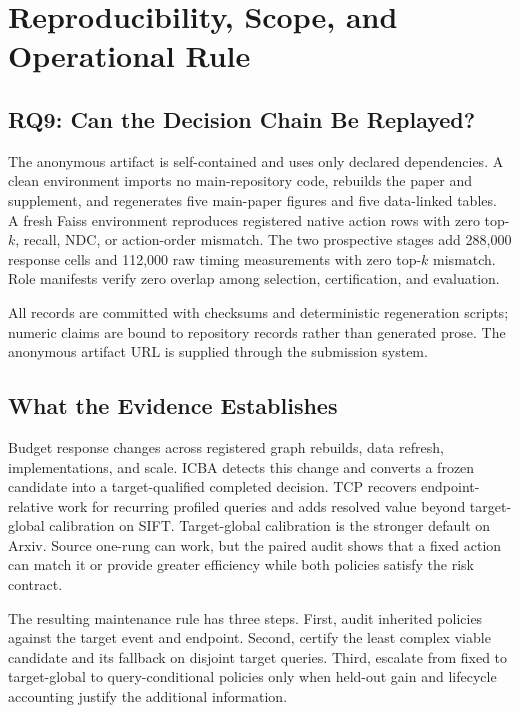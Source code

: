 \section{Reproducibility, Scope, and Operational Rule}
\label{sec:discussion}

\subsection{RQ9: Can the Decision Chain Be Replayed?}
The anonymous artifact is self-contained and uses only declared dependencies. A clean environment imports no main-repository code, rebuilds the paper and supplement, and regenerates five main-paper figures and five data-linked tables. A fresh Faiss environment reproduces registered native action rows with zero top-$k$, recall, NDC, or action-order mismatch. The two prospective stages add 288,000 response cells and 112,000 raw timing measurements with zero top-$k$ mismatch. Role manifests verify zero overlap among selection, certification, and evaluation.

All records are committed with checksums and deterministic regeneration scripts; numeric claims are bound to repository records rather than generated prose. The anonymous artifact URL is supplied through the submission system.

\subsection{What the Evidence Establishes}
Budget response changes across registered graph rebuilds, data refresh, implementations, and scale. ICBA detects this change and converts a frozen candidate into a target-qualified completed decision. TCP recovers endpoint-relative work for recurring profiled queries and adds resolved value beyond target-global calibration on SIFT. Target-global calibration is the stronger default on Arxiv. Source one-rung can work, but the paired audit shows that a fixed action can match it or provide greater efficiency while both policies satisfy the risk contract.

The resulting maintenance rule has three steps. First, audit inherited policies against the target event and endpoint. Second, certify the least complex viable candidate and its fallback on disjoint target queries. Third, escalate from fixed to target-global to query-conditional policies only when held-out gain and lifecycle accounting justify the additional information.

